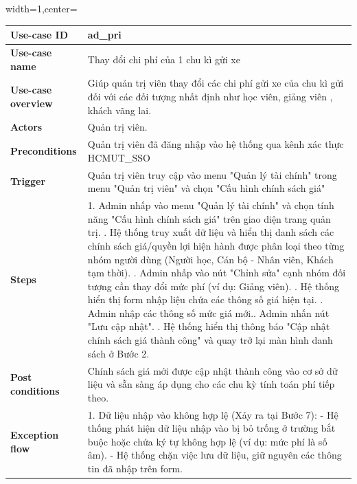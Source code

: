 \begin{adjustbox}{width=1\textwidth,center=\textwidth}
\small
\begin{tabular}{|>{\centering\arraybackslash}m{3.5cm}|m{13.2cm}|}
\hline
\textbf{Use-case ID} & ad\_pri \\ \hline
\textbf{Use-case name} & Thay đổi chi phí của 1 chu kì gửi xe \\ \hline
\textbf{Use-case overview} & Giúp quản trị viên thay đổi các chi phí gửi xe của  chu kì gửi đối với các đối tượng nhất định như học viên, giảng viên , khách vãng lai. \\ \hline
\textbf{Actors} & Quản trị viên. \\ \hline
\textbf{Preconditions} & Quản trị viên đã đăng nhập vào hệ thống qua kênh xác thực HCMUT\_SSO \\ \hline
\textbf{Trigger} & Quản trị viên truy cập vào menu "Quản lý tài chính" trong menu "Quản trị viên" và chọn "Cấu hình chính sách giá" \\ \hline
\textbf{Steps} & 
1. Admin nhấp vào menu "Quản lý tài chính" và chọn tính năng "Cấu hình chính sách giá" trên giao diện trang quản trị. \newline
2. Hệ thống truy xuất dữ liệu và hiển thị danh sách các chính sách giá/quyền lợi hiện hành được phân loại theo từng nhóm người dùng (Người học, Cán bộ - Nhân viên, Khách tạm thời). \newline
3. Admin nhấp vào nút "Chỉnh sửa" cạnh nhóm đối tượng cần thay đổi mức phí (ví dụ: Giảng viên). \newline
4. Hệ thống hiển thị form nhập liệu chứa các thông số giá hiện tại. \newline
5. Admin nhập các thông số mức giá mới.\newline
6. Admin nhấn nút "Lưu cập nhật". \newline
7. Hệ thống hiển thị thông báo "Cập nhật chính sách giá thành công" và quay trở lại màn hình danh sách ở Bước 2.\\ \hline
\textbf{Post conditions} &  Chính sách giá mới được cập nhật thành công vào cơ sở dữ liệu và sẵn sàng áp dụng cho các chu kỳ tính toán phí tiếp theo.\\ \hline
\textbf{Exception flow} & 
1. Dữ liệu nhập vào không hợp lệ (Xảy ra tại Bước 7): \newline
- Hệ thống phát hiện dữ liệu nhập vào bị bỏ trống ở trường bắt buộc hoặc chứa ký tự không hợp lệ (ví dụ: mức phí là số âm). \newline
- Hệ thống chặn việc lưu dữ liệu, giữ nguyên các thông tin đã nhập trên form. \newline

\end{tabular}
\end{adjustbox}
